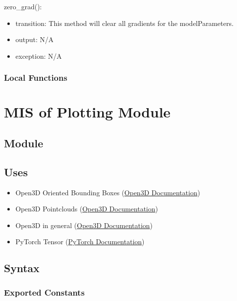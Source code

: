 \documentclass[12pt, titlepage]{article}
\begin{document}
\noindent zero\_grad():
\begin{itemize}
\item transition: This method will clear all gradients for the modelParameters.
\item output: N/A
\item exception: N/A
\end{itemize}

\subsubsection{Local Functions}

\newpage

\section{MIS of Plotting Module} \label{ModulePlot} 

\subsection{Module}



\subsection{Uses}
\begin{itemize}
  \item Open3D Oriented Bounding Boxes (\href{https://www.open3d.org/docs/latest/python_api/open3d.geometry.OrientedBoundingBox.html}{Open3D Documentation})
  \item Open3D Pointclouds (\href{https://www.open3d.org/docs/release/python_api/open3d.geometry.PointCloud.html}{Open3D Documentation})
  \item Open3D in general (\href{https://www.open3d.org/docs/release/introduction.html}{Open3D Documentation})
  \item PyTorch Tensor (\href{https://pytorch.org/docs/stable/tensors.html}{PyTorch Documentation})
\end{itemize}

\subsection{Syntax}



\subsubsection{Exported Constants}
\end{document}
